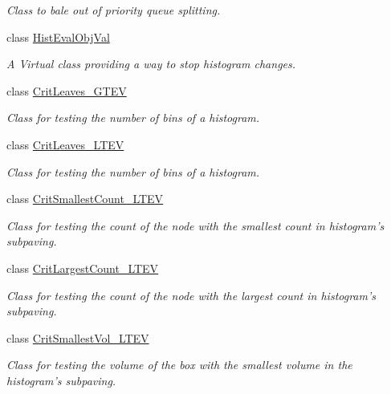 \begin{DoxyCompactItemize}
\begin{DoxyCompactList}\small\item\em \-Class to bale out of priority queue splitting. \end{DoxyCompactList}\item 
class \hyperlink{classsubpavings_1_1HistEvalObjVal}{\-Hist\-Eval\-Obj\-Val}
\begin{DoxyCompactList}\small\item\em \-A \-Virtual class providing a way to stop histogram changes. \end{DoxyCompactList}\item 
class \hyperlink{classsubpavings_1_1CritLeaves__GTEV}{\-Crit\-Leaves\-\_\-\-G\-T\-E\-V}
\begin{DoxyCompactList}\small\item\em \-Class for testing the number of bins of a histogram. \end{DoxyCompactList}\item 
class \hyperlink{classsubpavings_1_1CritLeaves__LTEV}{\-Crit\-Leaves\-\_\-\-L\-T\-E\-V}
\begin{DoxyCompactList}\small\item\em \-Class for testing the number of bins of a histogram. \end{DoxyCompactList}\item 
class \hyperlink{classsubpavings_1_1CritSmallestCount__LTEV}{\-Crit\-Smallest\-Count\-\_\-\-L\-T\-E\-V}
\begin{DoxyCompactList}\small\item\em \-Class for testing the count of the node with the smallest count in histogram's subpaving. \end{DoxyCompactList}\item 
class \hyperlink{classsubpavings_1_1CritLargestCount__LTEV}{\-Crit\-Largest\-Count\-\_\-\-L\-T\-E\-V}
\begin{DoxyCompactList}\small\item\em \-Class for testing the count of the node with the largest count in histogram's subpaving. \end{DoxyCompactList}\item 
class \hyperlink{classsubpavings_1_1CritSmallestVol__LTEV}{\-Crit\-Smallest\-Vol\-\_\-\-L\-T\-E\-V}
\begin{DoxyCompactList}\small\item\em \-Class for testing the volume of the box with the smallest volume in the histogram's subpaving. \end{DoxyCompactList}\item 

\end{DoxyCompactItemize}

